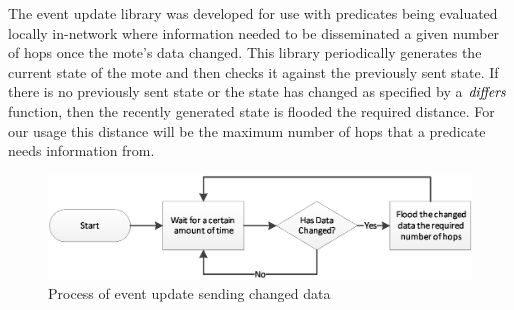 The event update library was developed for use with predicates being evaluated locally in-network where information needed to be disseminated a given number of hops once the mote's data changed. This library periodically generates the current state of the mote and then checks it against the previously sent state. If there is no previously sent state or the state has changed as specified by a $\mbox{\emph{differs}}$ function, then the recently generated state is flooded the required distance. For our usage this distance will be the maximum number of hops that a predicate needs information from.

\begin{figure}[H]
\includegraphics[width=\linewidth]{Diagrams/event-update-flowchart.eps}
\caption{Process of event update sending changed data}
\end{figure}

